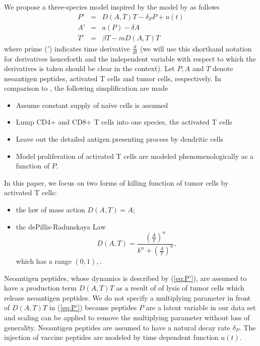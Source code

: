 \documentclass[review,authoryear]{elsarticle}
\begin{document}
We propose a three-species model inspired by the model by \cite{Messan2021} as follows
\begin{subequations}\label{eq:3sp-model}
\begin{eqnarray} 
P' & = & D(A,T)T-\delta_{P}P+u(t)\label{eq:P'}\\
A' & = & a(P)-\delta A\label{eq:A'}\\
T' & = & \beta T-mD(A,T)T\label{eq:T'}
\end{eqnarray}
\end{subequations}
where prime ($'$) indicates time derivative $\frac{d}{dt}$ (we will
use this shorthand notation for derivatives henceforth and the independent
variable with respect to which the derivatives is taken should be
clear in the context). Let $P, A$ and $T$ denote neoantigen peptides,
activated T cells and tumor cells, respectively. In comparison to \cite{Messan2021},
the following simplification are made
\begin{itemize}
\item Assume constant supply of na\"ive cells is assumed 
\item Lump CD4+ and CD8+ T cells into one species, the activated T
cells 
\item Leave out the detailed antigen presenting process by dendritic cells 
\item Model proliferation of activated T cells are modeled phenomenologically
as a function of $P$.
\end{itemize}

In this paper, we focus on two forms of killing function of tumor cells by activated T cells:
\begin{itemize}
\item the law of mass action $D(A,T)=A$;
\item the dePillis-Radunskaya Law 
\begin{equation}
D(A,T)=\frac{(\frac{A}{T})^{n}}{k^{n}+(\frac{A}{T})^{n}}, \label{eq:PR law-1}
\end{equation}
which has a range $(0,1),$. 
\end{itemize}

Neoantigen peptides, whose dynamics is described by (\ref{eq:P'}), are assumed to have a production term $D(A,T)T$ as a result of of lysis of tumor cells which release neoantigen peptides\citep{Konstorum2017}. We do not specify a multiplying parameter in front of $D(A,T)T$ in
(\ref{eq:P'}) because peptides $P$ are a latent variable in our data set and scaling
can be applied to remove the multiplying parameter without loss of
generality. Neoantigen peptides are assumed to have a natural decay rate $\delta_P$. The injection of vaccine peptides are modeled by time dependent function $u(t)$.
\end{document}
